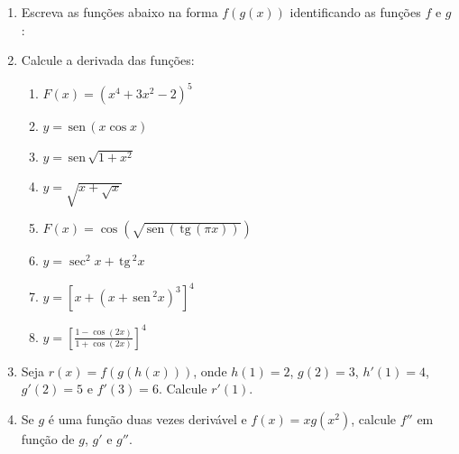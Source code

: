 \documentclass[a4paper,5pt]{amsbook}
\newcommand{\sen}{\,\mbox{sen}\,}
\newcommand{\tg}{\,\mbox{tg}\,}
\newcommand{\ds}{\displaystyle}
\begin{document}
\vspace{1cm}
\begin{enumerate}
    \vspace{0.5cm}
    \item Escreva as fun\c{c}\~oes abaixo na forma $f(g(x))$ identificando as fun\c{c}\~oes
        $f$ e $g$:


    \vspace{0.5cm}
    \item Calcule a derivada das fun\c{c}\~oes:
        \begin{enumerate}
            \vspace{0.3cm}
            \item $F(x)={(x^4+3x^2-2)}^5$
            \vspace{0.3cm}
            \item $y=\sen{(x \cos{x})}$
            \vspace{0.3cm}
            \item $y=\sen\sqrt{1+x^2}$
            \vspace{0.3cm}
            \item $y=\sqrt{x+\sqrt{x}}$
            \vspace{0.3cm}
            \item $F(x)=\cos\left(\sqrt{\sen{(\tg{(\pi x)})}}\right)$
            \vspace{0.3cm}
            \item $y = \sec^2x + \tg^2x$
            \vspace{0.3cm}
            \item $y = \left[x+(x+\sen^2x)^3\right]^4$
            \vspace{0.3cm}
            \item $y = \ds\left[\frac{1-\cos(2x)}{1+\cos(2x)}\right]^4$
        \end{enumerate}

    \vspace{0.5cm}
    \item Seja $r(x)=f(g(h(x)))$, onde $h(1)=2$, $g(2)=3$, $h'(1)=4$, $g'(2)=5$
        e $f'(3)=6$. Calcule $r'(1)$.

    \vspace{0.5cm}
    \item Se $g$ \'e uma fun\c{c}\~ao duas vezes deriv\'avel e $f(x)=xg(x^2)$, calcule
        $f''$ em fun\c{c}\~ao de $g$, $g'$ e $g''$.
\end{enumerate}
\end{document}
